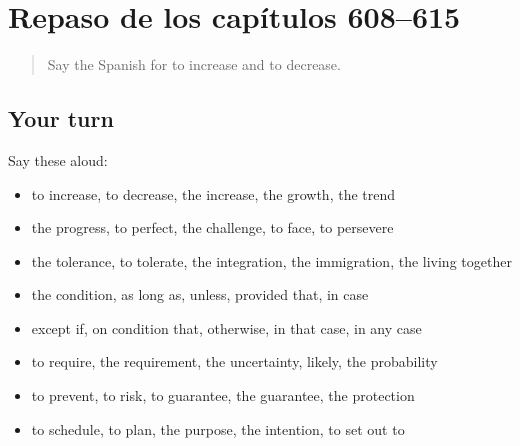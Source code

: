 \section[(dialogue)]{Repaso de los capítulos 608–615}

\label{lesson:ES-R615-repaso-608-615}



\begin{quote}
Say the Spanish for to increase and to decrease.
\end{quote}

\subsection*{Your turn}
Say these aloud:

\begin{itemize}
\raggedright
  \item to increase, to decrease, the increase, the growth, the trend
  \item the progress, to perfect, the challenge, to face, to persevere
  \item the tolerance, to tolerate, the integration, the immigration, the living together
  \item the condition, as long as, unless, provided that, in case
  \item except if, on condition that, otherwise, in that case, in any case
  \item to require, the requirement, the uncertainty, likely, the probability
  \item to prevent, to risk, to guarantee, the guarantee, the protection
  \item to schedule, to plan, the purpose, the intention, to set out to
\end{itemize}

